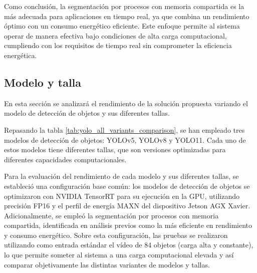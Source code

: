 \documentclass[11pt,spanish,listoffigures,listoftables]{tfgetsinf}
\begin{document}
Como conclusión, la segmentación por procesos con memoria compartida es la más adecuada para aplicaciones en tiempo real, ya que combina un rendimiento óptimo con un consumo energético eficiente. Este enfoque permite al sistema operar de manera efectiva bajo condiciones de alta carga computacional, cumpliendo con los requisitos de tiempo real sin comprometer la eficiencia energética.

\subsection{Modelo y talla} \label{sub:modelo_talla}
En esta sección se analizará el rendimiento de la solución propuesta variando el modelo de detección de objetos y sus diferentes tallas.

Repasando la tabla \ref{tab:yolo_all_variants_comparison}, se han empleado tres modelos de detección de objetos: YOLOv5, YOLOv8 y YOLO11. Cada uno de estos modelos tiene diferentes tallas, que son versiones optimizadas para diferentes capacidades computacionales. 

Para la evaluación del rendimiento de cada modelo y sus diferentes tallas, se estableció una configuración base común: los modelos de detección de objetos se optimizaron con NVIDIA TensorRT para su ejecución en la GPU, utilizando precisión FP16 y el perfil de energía MAXN del dispositivo Jetson AGX Xavier. Adicionalmente, se empleó la segmentación por procesos con memoria compartida, identificada en análisis previos como la más eficiente en rendimiento y consumo energético. Sobre esta configuración, las pruebas se realizaron utilizando como entrada estándar el vídeo de 84 objetos (carga alta y constante), lo que permite someter al sistema a una carga computacional elevada y así comparar objetivamente las distintas variantes de modelos y tallas.
\end{document}
